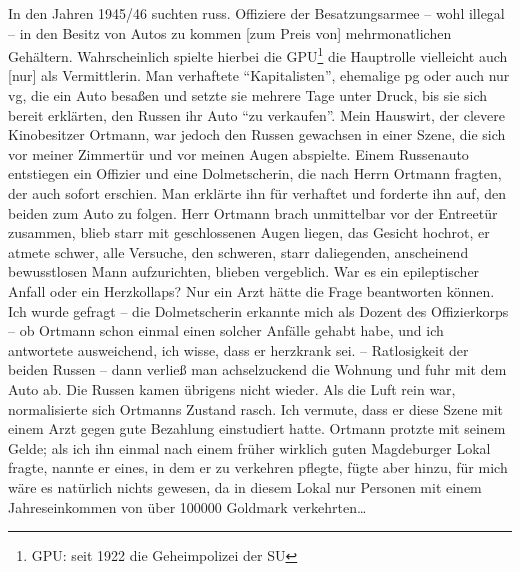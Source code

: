 In den Jahren 1945/46 suchten russ. Offiziere der Besatzungsarmee -- wohl illegal -- in den Besitz von Autos zu kommen [zum Preis von] mehrmonatlichen Gehältern. Wahrscheinlich spielte hierbei die GPU\footnote{GPU: seit 1922 die Geheimpolizei der SU} die Hauptrolle vielleicht auch [nur] als Vermittlerin. Man verhaftete \enquote{Kapitalisten}, ehemalige \ac{pg} oder auch nur \ac{vg}, die ein Auto besaßen und setzte sie mehrere Tage unter Druck, bis sie sich bereit erklärten, den Russen ihr Auto \enquote{zu verkaufen}. Mein Hauswirt, der clevere Kinobesitzer Ortmann, war jedoch den Russen gewachsen in einer Szene, die sich vor meiner Zimmertür und vor meinen Augen abspielte. Einem Russenauto entstiegen ein Offizier und eine Dolmetscherin, die nach Herrn Ortmann fragten, der auch sofort erschien. Man erklärte ihn für verhaftet und forderte ihn auf, den beiden zum Auto zu folgen. Herr Ortmann brach unmittelbar vor der Entreetür zusammen, blieb starr mit geschlossenen Augen liegen, das Gesicht hochrot, er atmete schwer, alle Versuche, den schweren, starr daliegenden, anscheinend bewusstlosen Mann aufzurichten, blieben vergeblich. War es ein epileptischer Anfall oder ein Herzkollaps? Nur ein Arzt hätte die Frage beantworten können. Ich wurde gefragt -- die Dolmetscherin erkannte mich als Dozent des Offizierkorps -- ob Ortmann schon einmal einen solcher Anfälle gehabt habe, und ich antwortete ausweichend, ich wisse, dass er herzkrank sei. -- Ratlosigkeit der beiden Russen -- dann verließ man achselzuckend die Wohnung und fuhr mit dem Auto ab. Die Russen kamen übrigens nicht wieder. Als die Luft rein war, normalisierte sich Ortmanns Zustand rasch. Ich vermute, dass er diese Szene mit einem Arzt gegen gute Bezahlung einstudiert hatte. Ortmann protzte mit seinem Gelde; als ich ihn einmal nach einem früher wirklich guten Magdeburger Lokal fragte, nannte er eines, in dem er zu verkehren pflegte, fügte aber hinzu, für mich wäre es natürlich nichts gewesen, da in diesem Lokal nur Personen mit einem Jahreseinkommen von über \num{100000} Goldmark verkehrten\dots

